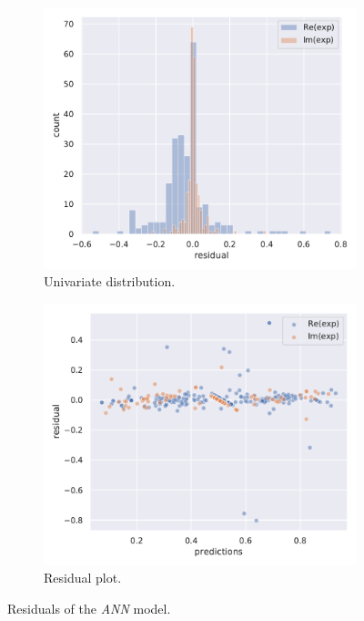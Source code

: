\begin{figure}[htbp]
  \centering
  \begin{subfigure}{0.45\textwidth}
    \centering
    \includegraphics[width=\linewidth]{img/test_res_dist}
    \caption{Univariate distribution.}
  \end{subfigure}
  \begin{subfigure}{0.45\textwidth}
    \centering
    \includegraphics[width=\linewidth]{img/test_res_plot}
    \caption{Residual plot.}
  \end{subfigure}
  \caption{Residuals of the \emph{ANN} model.}
  \label{fig:agg:ann_res}
\end{figure}
